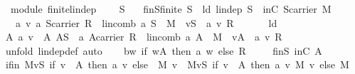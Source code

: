 \begin{isabellebody}
\ {\isacharparenleft}\ module{\isacharparenright}\ finite{\isacharunderscore}lin{\isacharunderscore}dep{\isacharcolon}\ \isanewline
\ \ \ S\isanewline
\ \ \ finS{\isacharcolon}{\isachardoublequoteopen}finite\ S{\isachardoublequoteclose}\ \ ld{\isacharcolon}\ {\isachardoublequoteopen}lin{\isacharunderscore}dep\ S{\isachardoublequoteclose}\ \ inC{\isacharcolon}\ {\isachardoublequoteopen}S{\isasymsubseteq}carrier\ M{\isachardoublequoteclose}\isanewline
\ \ \ {\isachardoublequoteopen}{\isasymexists}a\ v{\isachardot}\ {\isacharparenleft}a{\isasymin}\ {\isacharparenleft}S{\isasymrightarrow}carrier\ R{\isacharparenright}{\isacharparenright}\ {\isasymand}\ {\isacharparenleft}lincomb\ a\ S\ {\isacharequal}\ {\isasymzero}\isactrlbsub M\isactrlesub {\isacharparenright}\ {\isasymand}\ {\isacharparenleft}v{\isasymin}S{\isacharparenright}\ {\isasymand}\ {\isacharparenleft}a\ v{\isasymnoteq}\ {\isasymzero}\isactrlbsub R\isactrlesub {\isacharparenright}{\isachardoublequoteclose}\isanewline
%
\isadelimproof
%
\endisadelimproof
%
\isatagproof
{}\isamarkupfalse%
\ {\isacharminus}\ \isanewline
\ \ \isamarkupfalse%
\ ld\ \isamarkupfalse%
\ A\ a\ v\ \ A{\isacharcolon}\ {\isachardoublequoteopen}{\isacharparenleft}A{\isasymsubseteq}S\ {\isasymand}\ {\isacharparenleft}a{\isasymin}\ {\isacharparenleft}A{\isasymrightarrow}carrier\ R{\isacharparenright}{\isacharparenright}\ {\isasymand}\ {\isacharparenleft}lincomb\ a\ A\ {\isacharequal}\ {\isasymzero}\isactrlbsub M\isactrlesub {\isacharparenright}\ {\isasymand}\ {\isacharparenleft}v{\isasymin}A{\isacharparenright}\ {\isasymand}\ {\isacharparenleft}a\ v{\isasymnoteq}\ {\isasymzero}\isactrlbsub R\isactrlesub {\isacharparenright}{\isacharparenright}{\isachardoublequoteclose}\ \isanewline
\ \ \ \ \isamarkupfalse%
\ {\isacharparenleft}unfold\ lin{\isacharunderscore}dep{\isacharunderscore}def{\isacharcomma}\ auto{\isacharparenright}\isanewline
\ \ \isamarkupfalse%
\ {\isacharquery}b{\isacharequal}{\isachardoublequoteopen}{\isasymlambda}w{\isachardot}\ if\ w{\isasymin}A\ then\ a\ w\ else\ {\isasymzero}\isactrlbsub R\isactrlesub {\isachardoublequoteclose}\ \isanewline
\ \ \isamarkupfalse%
\ finS\ inC\ A\ \isamarkupfalse%
\ if{\isacharunderscore}in{\isacharcolon}\ {\isachardoublequoteopen}{\isacharparenleft}{\isasymOplus}\isactrlbsub M\isactrlesub v{\isasymin}S{\isachardot}\ {\isacharparenleft}if\ v\ {\isasymin}\ A\ then\ a\ v\ else\ {\isasymzero}{\isacharparenright}\ {\isasymodot}\isactrlbsub M\isactrlesub \ v{\isacharparenright}\ {\isacharequal}\ {\isacharparenleft}{\isasymOplus}\isactrlbsub M\isactrlesub v{\isasymin}S{\isachardot}\ {\isacharparenleft}if\ v\ {\isasymin}\ A\ then\ a\ v\ {\isasymodot}\isactrlbsub M\isactrlesub \ v\ else\ {\isasymzero}\isactrlbsub M\isactrlesub {\isacharparenright}{\isacharparenright}{\isachardoublequoteclose}\isanewline

\end{isabellebody}
